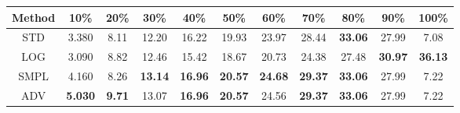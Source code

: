\documentclass{standalone}
\begin{document}
\begin{tabular}{c|cccccccccc}
      \toprule
      Method & 10\% & 20\% & 30\% & 40\% & 50\% & 60\% & 70\% & 80\% & 90\% & 100\% \\
      \midrule
STD & 3.380 & 8.11 & 12.20 & 16.22 & 19.93 & 23.97 & 28.44 & \textbf{33.06} & 27.99 & 7.08\\
LOG & 3.090 & 8.82 & 12.46 & 15.42 & 18.67 & 20.73 & 24.38 & 27.48 & \textbf{30.97} & \textbf{36.13}\\
SMPL & 4.160 & 8.26 & \textbf{13.14} & \textbf{16.96} & \textbf{20.57} & \textbf{24.68} & \textbf{29.37} & \textbf{33.06} & 27.99 & 7.22\\
ADV & \textbf{5.030} & \textbf{9.71} & 13.07 & \textbf{16.96} & \textbf{20.57} & 24.56 & \textbf{29.37} & \textbf{33.06} & 27.99 & 7.22\\
  \bottomrule
\end{tabular}
\end{document}
